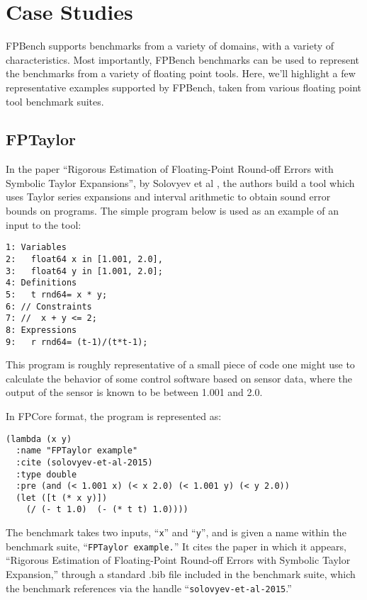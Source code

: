 \documentclass[main.tex]{subfiles}
\begin{document}
\section{Case Studies}

FPBench supports benchmarks from a variety of domains, with a variety
of characteristics. Most importantly, FPBench benchmarks can be used
to represent the benchmarks from a variety of floating point
tools. Here, we'll highlight a few representative examples supported
by FPBench, taken from various floating point tool benchmark suites.

\subsection{FPTaylor}
In the paper ``Rigorous Estimation of Floating-Point Round-off Errors
with Symbolic Taylor Expansions'', by Solovyev et al
\cite{fptaylor-fm15}, the authors build a tool which uses Taylor
series expansions and interval arithmetic to obtain sound error bounds
on programs. The simple program below is used as an example of an input
to the tool:

\begin{verbatim}
1: Variables
2:   float64 x in [1.001, 2.0],
3:   float64 y in [1.001, 2.0];
4: Definitions
5:   t rnd64= x * y;
6: // Constraints
7: //  x + y <= 2;
8: Expressions
9:   r rnd64= (t-1)/(t*t-1);
\end{verbatim}

This program is roughly representative of a small piece of code one
might use to calculate the behavior of some control software based on
sensor data, where the output of the sensor is known to be between
1.001 and 2.0.

In FPCore format, the program is represented as:

\begin{verbatim}
(lambda (x y)
  :name "FPTaylor example"
  :cite (solovyev-et-al-2015)
  :type double
  :pre (and (< 1.001 x) (< x 2.0) (< 1.001 y) (< y 2.0))
  (let ([t (* x y)])
    (/ (- t 1.0)  (- (* t t) 1.0))))
\end{verbatim}

The benchmark takes two inputs, ``\verb|x|'' and ``\verb|y|'', and is
given a name within the benchmark suite, ``\verb|FPTaylor example.|''
It cites the paper in which it appears, ``Rigorous Estimation of
Floating-Point Round-off Errors with Symbolic Taylor Expansion,''
through a standard .bib file included in the benchmark suite, which
the benchmark references via the handle
``\verb|solovyev-et-al-2015|.''
\end{document}
